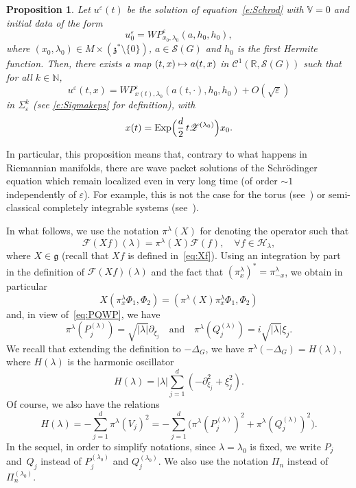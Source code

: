 \documentclass[JEP,XML,SOM,Unicode,published]{cedram}
\let\mathcal\mathscr
\newcommand\mto{\mathchoice{\longmapsto}{\mapsto}{\mapsto}{\mapsto}}
\DeclareMathOperator{\Exp}{Exp}
\theoremstyle{plain}
\newtheorem{proposition}[theorem]{Proposition}
\theoremstyle{definition}
\let\eps\varepsilon
\def\R{{\mathbb R}}
\def\N{{\mathbb N}}
\def\bbV{{\mathbb V}}
\begin{document}
\begin{proposition} \label{p:wpschrod}
Let $u^\eps(t)$ be the solution of equation~\eqref{e:Schrod} with $\bbV=0$ and initial data of the form
\[
u^\eps_0= WP^\eps_{x_0,\lambda_0} (a,h_0,h_0),
\]
where $(x_0,\lambda_0)\in M\times (\mathfrak z^*\setminus\{0\}) $, $a\in{\mathcal S}(G)$ and $h_0$ is the first Hermite function.
Then, there exists a map $(t,x)\mto a(t,x)$ in $\mathcal C^1(\R, {\mathcal S}(G))$ such that for all $k\in \N$,
\[
u^\eps(t,x) = WP^\eps_{x(t),\lambda_0} (a(t,\cdot),h_0,h_0)+O(\sqrt\eps)
\]
in $\Sigma^k_\eps$ (see \eqref{e:Sigmakeps} for definition), with
\[
x(t)= \Exp\Bigl(\frac{d}{2}\, t{\mathcal Z}^{(\lambda_0)} \Bigr) x_0.
\]
\end{proposition}
In particular, this proposition means that, contrary to what happens in Riemannian manifolds, there are wave packet solutions of the Schrödinger equation which \hbox{remain} localized even in very long time (of order $\sim 1$ independently of $\eps$). For example, this is not the case for the torus (see~\cite{AM14,BZ}) or semi-classical completely integrable systems (see~\cite{AFM15}).

In what follows, we use the notation $\pi^\lambda(X)$ for denoting the operator such that
\[
\mathcal F (Xf)(\lambda) =\pi^\lambda(X)\mathcal F(f),\quad \forall f\in \mathcal H_\lambda,
\]
where $X\in \mathfrak g$ (recall that $Xf$ is defined in~\eqref{eq:Xf}).
Using an integration by part in the definition of $\mathcal F (Xf)(\lambda)$ and the fact that $(\pi_x^\lambda)^*=\pi_{-x}^\lambda$, we obtain in particular
\begin{equation*}%
X (\pi^\lambda_x \Phi_1,\Phi_2)= (\pi^\lambda(X)\pi^\lambda_x \Phi_1,\Phi_2)
\end{equation*}
and, in view of~\eqref{eq:PQWP}, we have
\begin{equation} \label{e:comppilambda}
\pi^\lambda(P_j^{(\lambda)})= \sqrt{|\lambda|} \partial_{\xi_j}\quad \mbox{and}\quad \pi^\lambda(Q_j^{(\lambda)})=i \sqrt{|\lambda|} {\xi_j}.
\end{equation}
We recall that extending the definition to $-\Delta_G$, we have $\pi^\lambda(-\Delta_G)= H(\lambda)$, where $H(\lambda)$ is the harmonic oscillator
\begin{equation} \label{e:compHlambda}
H(\lambda)= |\lambda| \sum_{j=1}^{d} (-\partial_{\xi_j} ^2 +\xi_j^2).
\end{equation}
Of course, we also have the relations
\begin{equation*}%
H(\lambda)= -\sum_{j=1}^{d} \pi^\lambda (V_j)^2 =- \sum_{j=1}^{d} \bigl(\pi^\lambda (P^{(\lambda)}_j)^2 +\pi^\lambda (Q^{(\lambda)}_j)^2\bigr).
\end{equation*}
In the sequel, in order to simplify notations, since $\lambda=\lambda_0$ is fixed, we write $P_j$ and~$Q_j$ instead of $P_j^{(\lambda_0)}$ and $Q_j^{(\lambda_0)}$. We also use the notation $\Pi_n$ instead of $\Pi_n^{(\lambda_0)}$.
\end{document}
